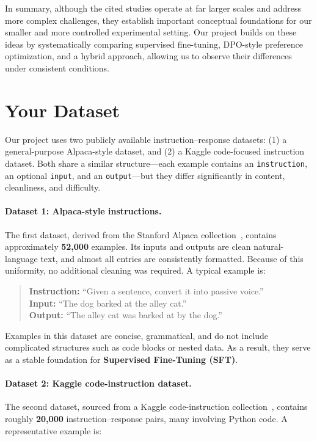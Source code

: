 \documentclass[11pt,a4paper]{article}
\begin{document}
In summary, although the cited studies operate at far larger scales and address more complex challenges, they establish important conceptual foundations for our smaller and more controlled experimental setting. Our project builds on these ideas by systematically comparing supervised fine-tuning, DPO-style preference optimization, and a hybrid approach, allowing us to observe their differences under consistent conditions.

\section{Your Dataset}

Our project uses two publicly available instruction–response datasets: (1) a general-purpose Alpaca-style dataset, and (2) a Kaggle code-focused instruction dataset. Both share a similar structure—each example contains an \texttt{instruction}, an optional \texttt{input}, and an \texttt{output}—but they differ significantly in content, cleanliness, and difficulty.

\paragraph{Dataset 1: Alpaca-style instructions.}
The first dataset, derived from the Stanford Alpaca collection~\cite{alpaca}, contains approximately \textbf{52,000} examples. Its inputs and outputs are clean natural-language text, and almost all entries are consistently formatted. Because of this uniformity, no additional cleaning was required. A typical example is:

\begin{quote}
\textbf{Instruction:} ``Given a sentence, convert it into passive voice.'' \\
\textbf{Input:} ``The dog barked at the alley cat.'' \\
\textbf{Output:} ``The alley cat was barked at by the dog.''
\end{quote}

Examples in this dataset are concise, grammatical, and do not include complicated structures such as code blocks or nested data. As a result, they serve as a stable foundation for \textbf{Supervised Fine-Tuning (SFT)}.

\paragraph{Dataset 2: Kaggle code-instruction dataset.}
The second dataset, sourced from a Kaggle code-instruction collection~\cite{qin2025instruction}, contains roughly \textbf{20,000} instruction--response pairs, many involving Python code. A representative example is:
\end{document}
